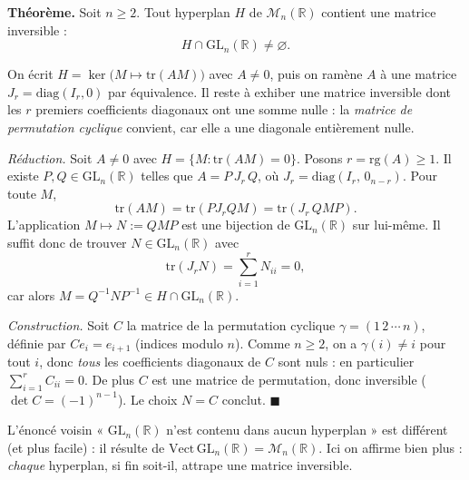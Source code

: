 \decsep{}


\begin{tcolorbox}[thmbox]
  \textbf{Théorème.}\enspace%
  Soit $n \geq 2$. Tout hyperplan $H$ de $\mathcal{M}_n(\mathbb{R})$ contient
  une matrice inversible :
  \[
    H \cap \mathrm{GL}_n(\mathbb{R}) \neq \varnothing.
  \]
\end{tcolorbox}

On écrit $H = \ker\bigl(M\mapsto\mathrm{tr}(AM)\bigr)$ avec $A\neq 0$, puis on
ramène $A$ à une matrice $J_r = \mathrm{diag}(I_r,0)$ par équivalence. Il reste
à exhiber une matrice inversible dont les $r$ premiers coefficients diagonaux
ont une somme nulle : la \emph{matrice de permutation cyclique} convient, car
elle a une diagonale entièrement nulle.

\begin{mdframed}[style=proofbar]
  \textit{Réduction.}\enspace%
  Soit $A \neq 0$ avec $H = \{M : \mathrm{tr}(AM)=0\}$. Posons $r = \mathrm{rg}(A) \geq 1$.
  Il existe $P,Q \in \mathrm{GL}_n(\mathbb{R})$ telles que $A = P\,J_r\,Q$, où
  $J_r = \mathrm{diag}(I_r,\,0_{n-r})$. Pour toute $M$,
  \[
    \mathrm{tr}(AM) = \mathrm{tr}(P J_r Q M) = \mathrm{tr}(J_r\,QMP).
  \]
  L'application $M \mapsto N := QMP$ est une bijection de $\mathrm{GL}_n(\mathbb{R})$
  sur lui-même. Il suffit donc de trouver $N \in \mathrm{GL}_n(\mathbb{R})$ avec
  \[
    \mathrm{tr}(J_r N) = \sum_{i=1}^{r} N_{ii} = 0,
  \]
  car alors $M = Q^{-1}N P^{-1} \in H \cap \mathrm{GL}_n(\mathbb{R})$.

  \medskip
  \textit{Construction.}\enspace%
  Soit $C$ la matrice de la permutation cyclique $\gamma = (1\,2\,\cdots\,n)$,
  définie par $C e_i = e_{i+1}$ (indices modulo $n$). Comme $n \geq 2$, on a
  $\gamma(i) \neq i$ pour tout $i$, donc \emph{tous} les coefficients diagonaux
  de $C$ sont nuls : en particulier $\sum_{i=1}^{r} C_{ii} = 0$. De plus $C$ est
  une matrice de permutation, donc inversible ($\det C = (-1)^{n-1}$). Le choix
  $N = C$ conclut. \hfill$\blacksquare$
\end{mdframed}

L'énoncé voisin « $\mathrm{GL}_n(\mathbb{R})$ n'est contenu dans aucun
hyperplan » est différent (et plus facile) : il résulte de $\mathrm{Vect}\,\mathrm{GL}_n(\mathbb{R}) = \mathcal{M}_n(\mathbb{R})$.
Ici on affirme bien plus : \emph{chaque} hyperplan, si fin soit-il, attrape une
matrice inversible.

